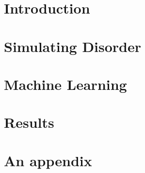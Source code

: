 \documentclass[12pt, oneside]{book}
\begin{document}
\listoffigures

\mainmatter

\chapter{Introduction}


\chapter{Simulating Disorder}


\chapter{Machine Learning}


\chapter{Results}



\appendix 


\chapter{An appendix}









\end{document}
